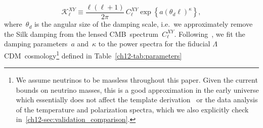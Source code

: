 \begin{equation}
	\mathcal{K}_\ell^{XY} \equiv \frac{\ell(\ell+1)}{2\pi}\, C_\ell^{XY} \exp\left\{a(\theta_d\ell)^\kappa \right\},	\label{ch12-eq:K_ell}
\end{equation}
where~$\theta_d$ is the angular size of the damping scale, i.e.\ we approximately remove the Silk damping from the lensed CMB~spectrum~$C_\ell^{XY}$. Following~\cite{Wallisch:2018rzj}, we fit the damping parameters~$a$ and~$\kappa$ to the power spectra for the fiducial $\Lambda$CDM~cosmology\hskip1pt\footnote{We assume neutrinos to be massless throughout this paper. Given the current bounds on neutrino masses, this is a good approximation in the early universe which essentially does not affect the template derivation~\cite{Imig:priv} or the data analysis of the temperature and polarization spectra, which we also explicitly check in~\textsection\ref{ch12-sec:validation_comparison}.} defined in Table~\ref{ch12-tab:parameters}%

